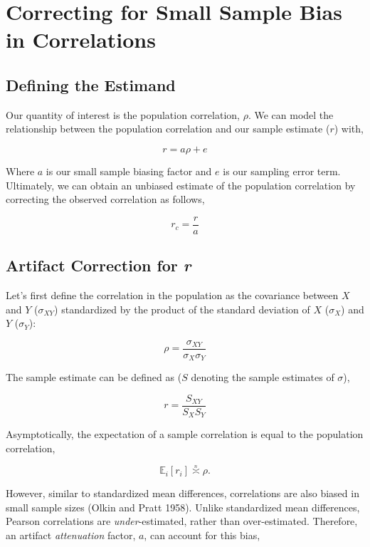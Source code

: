 \documentclass[
  letterpaper,
  DIV=11,
  numbers=noendperiod]{scrreprt}
\begin{document}
\hypertarget{correcting-for-small-sample-bias-in-correlations}{%
\section{Correcting for Small Sample Bias in
Correlations}\label{correcting-for-small-sample-bias-in-correlations}}

\hypertarget{defining-the-estimand}{%
\subsection{Defining the Estimand}\label{defining-the-estimand}}

Our quantity of interest is the population correlation, \(\rho\). We can
model the relationship between the population correlation and our sample
estimate (\(r\)) with,

\[
r = a\rho+e
\]

Where \(a\) is our small sample biasing factor and \(e\) is our sampling
error term. Ultimately, we can obtain an unbiased estimate of the
population correlation by correcting the observed correlation as
follows,

\[
r_c = \frac{r}{a}
\]

\hypertarget{artifact-correction-for-r}{%
\subsection{\texorpdfstring{Artifact Correction for
\emph{r}}{Artifact Correction for r}}\label{artifact-correction-for-r}}

Let's first define the correlation in the population as the covariance
between \(X\) and \(Y\) (\(\sigma_{XY}\)) standardized by the product of
the standard deviation of \(X\) (\(\sigma_X\)) and \(Y\) (\(\sigma_Y\)):

\[
\rho = \frac{\sigma_{XY}}{\sigma_{X}\sigma_Y}
\]

The sample estimate can be defined as (\(S\) denoting the sample
estimates of \(\sigma\)),

\[
r = \frac{S_{XY}}{S_{X}S_Y}
\]

Asymptotically, the expectation of a sample correlation is equal to the
population correlation,

\[
\mathbb{E}_i[r_i] \overset{_n}{\asymp} \rho.
\]

However, similar to standardized mean differences, correlations are also
biased in small sample sizes (Olkin and Pratt 1958). Unlike standardized
mean differences, Pearson correlations are \emph{under}-estimated,
rather than over-estimated. Therefore, an artifact \emph{attenuation}
factor, \(a\), can account for this bias,
\end{document}
